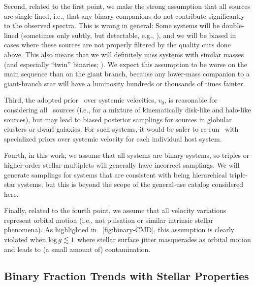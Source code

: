 \documentclass[modern]{aastex63}
\begin{document}
Second, related to the first point, we make the strong assumption that all
sources are single-lined, i.e., that any binary companions do not contribute
significantly to the observed spectra.
This is wrong in general: Some systems will be double-lined (sometimes only
subtly, but detectable, e.g., \citealt{El-Badry:2018}), and we will be biased in
cases where these sources are not properly filtered by the quality cuts done
above.
This also means that we will definitely miss systems with similar masses (and
especially ``twin'' binaries; \citealt{El-Badry:2019}).
We expect this assumption to be worse on the main sequence than on the giant
branch, because any lower-mass companion to a giant-branch star will have a
luminosity hundreds or thousands of times fainter.

Third, the adopted prior \pdf\ over systemic velocities, $v_0$, is reasonable
for considering all \apogee\ sources (i.e., for a mixture of kinematically
disk-like and halo-like sources), but may lead to biased posterior samplings for
sources in globular clusters or dwarf galaxies.
For such systems, it would be safer to re-run \thejoker\ with specialized priors
over systemic velocity for each individual host system.

Fourth, in this work, we assume that all systems are binary systems, so triples
or higher-order stellar multiplets will generally have incorrect samplings.
We will generate samplings for systems that are consistent with being
hierarchical triple-star systems, but this is beyond the scope of the
general-use catalog considered here.

Finally, related to the fourth point, we assume that all velocity variations
represent orbital motion (i.e., not pulsation or similar intrinsic stellar
phenomena).
As highlighted in \figurename~\ref{fig:binary-CMD}, this assumption is clearly
violated when $\log g \lesssim 1$ where stellar surface jitter masquerades
as orbital motion and leads to (a small amount of) contamination.


\subsection{Binary Fraction Trends with Stellar Properties}
\label{sec:binary-trends}
\end{document}

